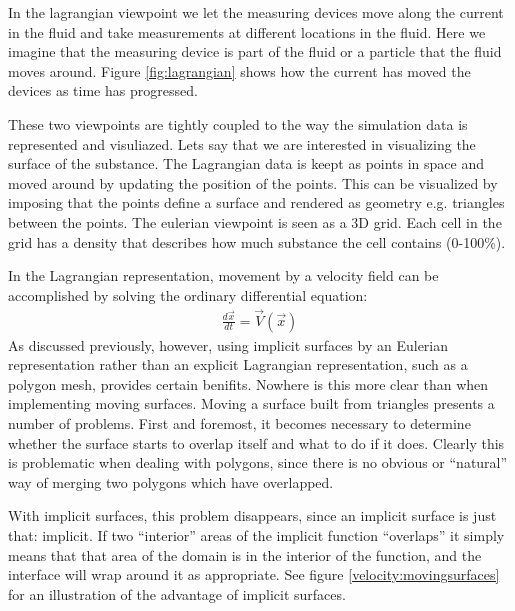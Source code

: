 In the lagrangian viewpoint we let the measuring devices move along
the current in the fluid and take measurements at different locations
in the fluid. Here we imagine that the measuring device is part of the
fluid or a particle that the fluid moves around. Figure
\ref{fig:lagrangian} shows how the current has moved the devices as
time has progressed.

These two viewpoints are tightly coupled to the way the simulation data
is represented and visuliazed. Lets say that we are interested in
visualizing the surface of the substance.
%
The Lagrangian data is keept as points in space and moved around by
updating the position of the points. This can be visualized by
imposing that the points define a surface and rendered as geometry
e.g. triangles between the points.
%
The eulerian viewpoint is seen as a 3D grid. Each cell in the grid has
a density that describes how much substance the cell contains (0-100\%).

In the Lagrangian representation, movement by a velocity field can be
accomplished by solving the ordinary differential equation:
\begin{align} %
\frac{d\vec{x}}{dt} = \vec{V}\left(\vec{x}\right)
\end{align}
As discussed previously, however, using implicit surfaces by an
Eulerian representation rather than an explicit Lagrangian
representation, such as a polygon mesh, provides certain
benifits. Nowhere is this more clear than when implementing moving
surfaces. Moving a surface built from triangles presents a number of
problems. First and foremost, it becomes necessary to determine
whether the surface starts to overlap itself and what to do if it
does. Clearly this is problematic when dealing with polygons, since
there is no obvious or ``natural'' way of merging two polygons which
have overlapped.


With implicit surfaces, this problem disappears, since an implicit
surface is just that: implicit. If two ``interior'' areas of the
implicit function ``overlaps'' it simply means that that area of the
domain is in the interior of the function, and the interface will wrap
around it as appropriate. See figure \vref{velocity:movingsurfaces}
for an illustration of the advantage of implicit surfaces.


